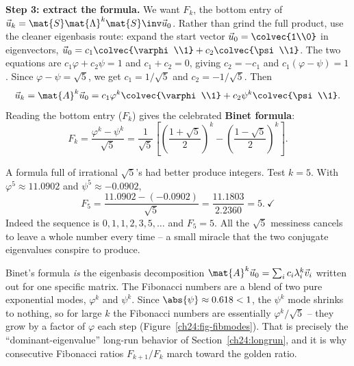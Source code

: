 \textbf{Step 3: extract the formula.} We want $F_k$, the bottom entry of
$\vec{u}_k = \mat{S}\mat{\Lambda}^k\mat{S}\inv\vec{u}_0$. Rather than grind the
full product, use the cleaner eigenbasis route: expand the start vector
$\vec{u}_0 = \colvec{1\\0}$ in eigenvectors, $\vec{u}_0 = c_1\colvec{\varphi\\1} +
c_2\colvec{\psi\\1}$. The two equations are $c_1\varphi + c_2\psi = 1$ and
$c_1 + c_2 = 0$, giving $c_2 = -c_1$ and $c_1(\varphi-\psi) = 1$. Since
$\varphi - \psi = \sqrt5$, we get $c_1 = 1/\sqrt5$ and $c_2 = -1/\sqrt5$. Then
\[
  \vec{u}_k = \mat{A}^k\vec{u}_0
  = c_1\varphi^k\colvec{\varphi\\1} + c_2\psi^k\colvec{\psi\\1}.
\]
Reading the bottom entry ($F_k$) gives the celebrated \textbf{Binet formula}:
\[
  \boxed{\;F_k = \frac{\varphi^k - \psi^k}{\sqrt5}
        = \frac{1}{\sqrt5}\!\left[\left(\frac{1+\sqrt5}{2}\right)^{\!k}
        - \left(\frac{1-\sqrt5}{2}\right)^{\!k}\right].\;}
\]

\begin{example}
\label{ch24:binet-check}
A formula full of irrational $\sqrt5$'s had better produce integers. Test
$k=5$. With $\varphi^5 \approx 11.0902$ and $\psi^5 \approx -0.0902$,
\[
  F_5 = \frac{11.0902 - (-0.0902)}{\sqrt5}
      = \frac{11.1803}{2.2360} = 5.\ \checkmark
\]
Indeed the sequence is $0,1,1,2,3,5,\dots$ and $F_5 = 5$. All the $\sqrt5$
messiness cancels to leave a whole number every time -- a small miracle that the
two conjugate eigenvalues conspire to produce.
\end{example}

\begin{intuitionbox}
Binet's formula \emph{is} the eigenbasis decomposition $\mat{A}^k\vec{u}_0 =
\sum_i c_i\lambda_i^k\vec{v}_i$ written out for one specific matrix. The Fibonacci
numbers are a blend of two pure exponential modes, $\varphi^k$ and $\psi^k$.
Since $\abs{\psi}\approx0.618<1$, the $\psi^k$ mode shrinks to nothing, so for
large $k$ the Fibonacci numbers are essentially $\varphi^k/\sqrt5$ -- they grow
by a factor of $\varphi$ each step (Figure~\ref{ch24:fig-fibmodes}). That is precisely the
``dominant-eigenvalue'' long-run behavior of
Section~\ref{ch24:longrun}, and it is why consecutive Fibonacci ratios
$F_{k+1}/F_k$ march toward the golden ratio.
\end{intuitionbox}

